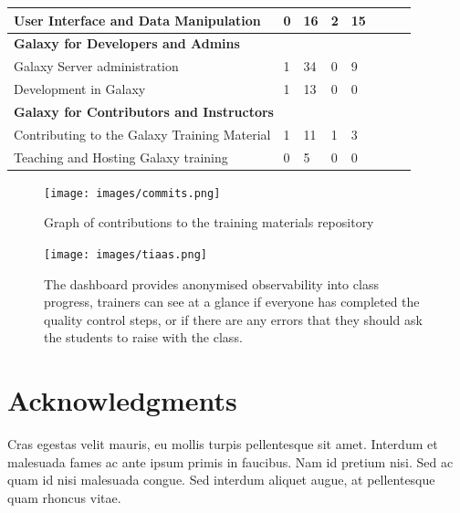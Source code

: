 \documentclass[10pt,letterpaper]{article}
\begin{document}
\begin{table}[]
\begin{adjustwidth}{-2.25in}{0in}
\begin{tabular}{p{2in}|p{0.8in}llp{0.8in}lll}
		\hline
		User Interface and Data Manipulation 	        & 0 	& 16 	& 2 	& 15\\
		\hline
		\multicolumn{5}{l}{\textbf{Galaxy for Developers and Admins}}\\
		\hline
		Galaxy Server administration                    & 1 	& 34 	& 0 	& 9\\
		Development in Galaxy 	                        & 1 	& 13 	& 0 	& 0\\
		\hline
		\multicolumn{5}{l}{\textbf{Galaxy for Contributors and Instructors}}\\
		\hline
		Contributing to the Galaxy Training Material 	& 1 	& 11 	& 1 	& 3\\
		Teaching and Hosting Galaxy training 	        & 0 	& 5 	& 0 	& 0\\
	\end{tabular}
\end{adjustwidth}
\end{table}


\begin{figure}[!ht]
	\centering
	\texttt{[image: images/commits.png]}
	\caption{Graph of contributions to the training materials repository\label{fig:contributions}}
\end{figure}

\begin{figure}[!ht]
	\centering
	\texttt{[image: images/tiaas.png]}
	\caption{The dashboard provides anonymised observability into class progress, trainers can see at a glance if everyone has completed the quality control steps, or if there are any errors that they should ask the students to raise with the class.\label{fig:tiaas-dashboard}}
\end{figure}

\section*{Acknowledgments}
Cras egestas velit mauris, eu mollis turpis pellentesque sit amet. Interdum et malesuada fames ac ante ipsum primis in faucibus. Nam id pretium nisi. Sed ac quam id nisi malesuada congue. Sed interdum aliquet augue, at pellentesque quam rhoncus vitae.



%
%
%
\end{document}
